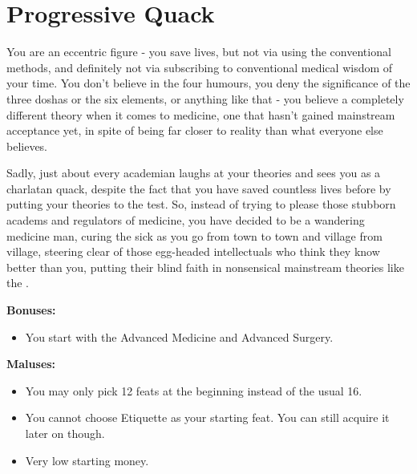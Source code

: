 \section{Progressive Quack}
You are an eccentric figure - you save lives, but not via using the conventional methods, and definitely not via subscribing to conventional medical wisdom of your time. You don't believe in the four humours, you deny the significance of the three doshas or the six elements, or anything like that - you believe a completely different theory when it comes to medicine, one that hasn't gained mainstream acceptance yet, in spite of being far closer to reality than what everyone else believes.

Sadly, just about every academian laughs at your theories and sees you as a charlatan quack, despite the fact that you have saved countless lives before by putting your  theories to the test. So, instead of trying to please those stubborn academs and regulators of medicine, you have decided to be a wandering medicine man, curing the sick as you go from town to town and village from village, steering clear of those egg-headed intellectuals who think they know better than you, putting their blind faith in nonsensical mainstream theories like the .

\textbf{Bonuses:}
\begin{itemize}
	\item You start with the Advanced Medicine and Advanced Surgery.
\end{itemize}

\textbf{Maluses:}
\begin{itemize}
	\item You may only pick 12 feats at the beginning instead of the usual 16.
	\item You cannot choose Etiquette as your starting feat. You can still acquire it later on though.
	\item Very low starting money.
\end{itemize}
